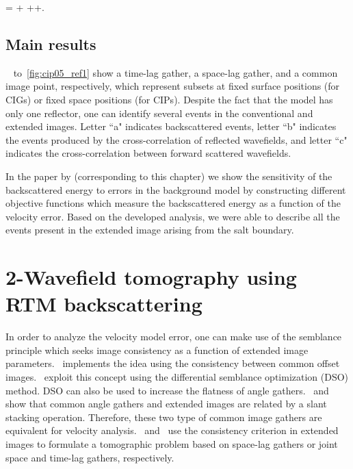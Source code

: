 \beq
\Re = + ++.
\label{eq:eicsplit}
\eeq



\subsection{Main results}


~ to~\ref{fig:cip05_ref1} show a time-lag gather, a space-lag gather,
 and a common image point, respectively, which represent subsets at fixed surface positions (for CIGs) or fixed space positions 
(for CIPs). Despite the fact that the model has only one reflector, one can identify several events in the conventional and extended images. 
Letter ``a" indicates backscattered events, letter ``b" indicates the events produced by the cross-correlation of 
reflected wavefields, and letter ``c" indicates the cross-correlation between forward scattered wavefields.

In the paper by  \cite{DiazRTM} (corresponding to this chapter) we show the sensitivity
of the backscattered energy to errors in the background model by constructing different
objective functions which measure the backscattered energy as a function of the velocity 
error. Based on the developed analysis, we were able to describe all the events present
in the extended image arising from the salt boundary. 


\newpage
\section{2-Wavefield tomography using RTM backscattering}

In order to analyze the velocity model error, one can make use of the semblance
 principle which seeks image consistency as a function of extended image 
parameters.~\cite{stork} implements the idea using the consistency between common 
offset images.~\cite{symes.carazzone} exploit this concept using the differential
 semblance optimization (DSO) method. DSO can also be used to increase the 
flatness of angle gathers.~\cite{rickett:883} and \cite{sava:1065} show that
 common angle gathers and extended images are related by a slant stacking
 operation. Therefore, these two type of common image gathers are equivalent for
 velocity analysis.~\cite{shen:VE49} and~\cite{Yang2011} use the consistency 
criterion in extended images to formulate a tomographic problem based on 
space-lag gathers or joint space and time-lag gathers, respectively.

